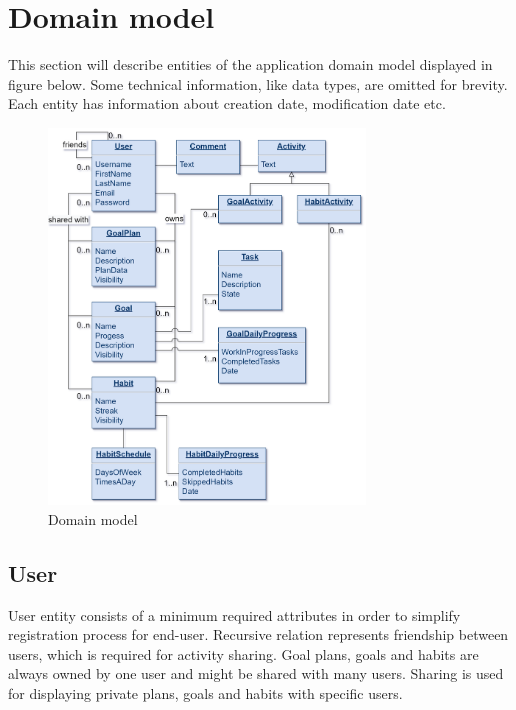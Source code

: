 
\section{Domain model}\label{sec:domain-model}

This section will describe entities of the application domain model displayed in figure below.
Some technical information, like data types, are omitted for brevity.
Each entity has information about creation date, modification date etc.

\begin{figure}[h]
    \includegraphics[width=0.75\textwidth]{images/pda-domain-model}
    \caption{Domain model}
    \label{fig:domain-model}
\end{figure}


\subsection{User}\label{subsec:user}

User entity consists of a minimum required attributes in order to simplify registration process for end-user.
Recursive relation represents friendship between users, which is required for activity sharing.
Goal plans, goals and habits are always owned by one user and might be shared with many users.
Sharing is used for displaying private plans, goals and habits with specific users.

